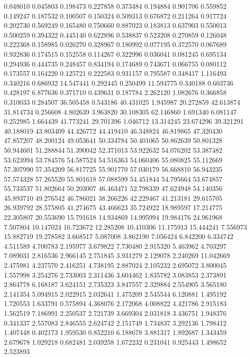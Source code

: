 0.048010
0.045803
0.198473
0.227858
0.373484
0.194884
0.901706
0.559852
0.149247
0.187532
0.100507
0.150324
0.509313
0.676872
0.211264
0.917724
0.202730
0.569249
0.165480
0.750660
0.887023
0.183813
0.637903
0.550013
0.500259
0.394322
0.445140
0.622896
0.538837
0.523208
0.270859
0.126048
0.222368
0.158985
0.026270
0.328967
0.180992
0.077195
0.372570
0.067689
0.932836
0.174515
0.152558
0.114267
0.322996
0.036041
0.081245
0.695134
0.294936
0.444735
0.248457
0.834194
0.174689
0.743671
0.066755
0.080112
0.173557
0.164220
0.125721
0.222583
0.931157
0.795587
0.348417
1.116493
0.340216
0.686932
14.547441
0.292445
0.250499
11.594775
0.340188
0.603736
0.428197
6.877636
0.371710
0.439631
0.187784
2.262120
1.082676
0.366858
0.310033
0.284507
36.505458
0.543186
40.431025
1.945987
20.272859
42.613874
31.814734
0.256608
4.802639
3.963820
30.108305
62.146860
1.691340
6.081147
0.252985
1.664439
41.773241
29.701396
1.046712
13.314245
23.674296
39.321291
40.188019
43.803409
44.426772
44.419410
46.348824
46.819865
47.320430
47.857207
48.200124
49.053641
50.334784
50.401065
50.862639
50.801328
50.944601
51.288844
51.390042
52.371013
53.922632
54.076202
53.387482
53.623994
53.784576
54.587524
54.516363
54.060406
55.080825
55.112669
57.307990
57.354209
56.817725
55.901770
57.030179
56.668810
56.943235
57.574328
57.265520
55.801618
57.088599
54.451844
54.795664
53.674857
55.733537
51.802664
50.203007
46.463471
52.798339
47.624948
54.140356
45.893710
49.276542
46.786021
38.266226
42.229467
41.213181
29.615705
26.939792
28.575805
41.274675
43.466623
35.724922
18.989597
17.214775
22.305807
20.553690
15.791618
14.934869
14.995994
19.984176
24.961968
7.507804
10.147024
16.723672
12.285208
10.410306
11.175913
15.444241
7.556973
15.882719
19.278582
3.668517
5.087008
3.862190
7.056424
6.842200
6.334742
4.511589
4.700783
2.195977
3.679822
7.730480
2.915320
5.463962
4.703297
7.089031
2.816536
2.966145
2.751845
3.931279
2.129078
2.240269
11.042669
2.475981
4.237570
2.416251
4.738195
2.887024
2.105232
2.695072
3.800045
1.557998
3.254276
2.733003
2.311436
3.604462
1.835782
3.083853
2.373891
2.864778
6.168187
3.624151
2.735323
3.847557
2.329884
2.554905
3.565180
2.141354
5.094915
2.022915
2.032641
1.475209
2.545544
6.120881
1.495192
1.720553
1.633791
0.575894
4.368076
2.172068
4.008822
4.421786
2.915183
1.562519
7.186991
2.250537
2.721739
3.669304
2.031818
3.436751
1.948376
0.341337
2.557083
2.846555
2.624742
2.151749
1.734837
3.292136
1.798412
1.407448
0.402173
1.959530
0.852210
6.188678
3.881317
1.892687
1.343459
2.679678
1.029218
0.682481
2.039258
1.672232
0.231041
0.925443
1.498652
2.523893
